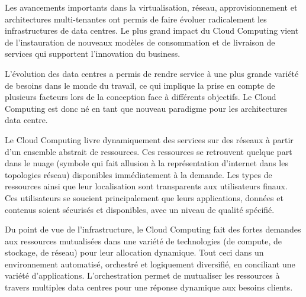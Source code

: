 Les avancements importants dans la virtualisation, réseau, approvisionnement et architectures multi-tenantes ont permis de faire évoluer radicalement les infrastructures de data centres. Le plus grand impact du Cloud Computing vient de l'instauration de nouveaux modèles de consommation et de livraison de services qui supportent l'innovation du business.



L'évolution des data centres a permis de rendre service à une plus grande variété de besoins dans le monde du travail, ce qui implique la prise en compte de plusieurs facteurs lors de la conception face à différents objectifs. Le Cloud Computing est donc né en tant que nouveau paradigme pour les architectures data centre.


Le Cloud Computing livre dynamiquement des services sur des réseaux à partir d'un ensemble abstrait de ressources. Ces ressources se retrouvent quelque part dans le \og nuage \fg{} (symbole qui fait allusion à la représentation d'internet dans les topologies réseau) disponibles immédiatement à la demande. Les types de ressources ainsi que leur localisation sont transparents aux utilisateurs finaux. Ces utilisateurs se soucient principalement que leurs applications, données et contenus soient sécurisés et disponibles, avec un niveau de qualité spécifié.


Du point de vue de l'infrastructure, le Cloud Computing fait des fortes demandes aux ressources mutualisées dans une variété de technologies (de compute, de stockage, de réseau) pour leur allocation dynamique. Tout ceci dans un environnement automatisé, orchestré et logiquement diversifié, en conciliant une variété d'applications. L'orchestration permet de mutualiser les ressources à travers multiples data centres pour une réponse dynamique aux besoins clients. 


